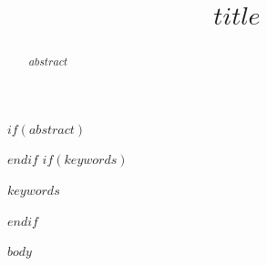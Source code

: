 \documentclass[conference,a4paper]{IEEEtran}
\begin{document}
\title{$title$}
\author{
}
\maketitle

$if(abstract)$
\begin{abstract}
$abstract$
\end{abstract}
$endif$
$if(keywords)$
\begin{IEEEkeywords}
$keywords$
\end{IEEEkeywords}
$endif$

$body$
\end{document}
